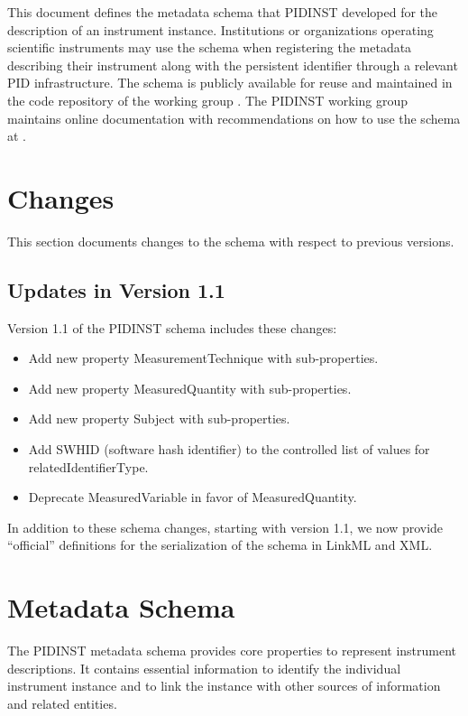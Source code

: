\documentclass[titlepage=true,twoside=false,DIV=13]{scrartcl}
\begin{document}
This document defines the metadata schema that PIDINST developed for
the description of an instrument instance.  Institutions or
organizations operating scientific instruments may use the schema when
registering the metadata describing their instrument along with the
persistent identifier through a relevant PID infrastructure.  The
schema is publicly available for reuse and maintained in the code
repository of the working group \cite{pidinst:github}.  The PIDINST
working group maintains online documentation with recommendations on
how to use the schema at \cite{pidinst:whitepaper}.

\section{Changes}
\label{changes}

This section documents changes to the schema with respect to previous
versions.

\subsection{Updates in Version 1.1}

Version 1.1 of the PIDINST schema includes these changes:
\begin{itemize}
\item Add new property MeasurementTechnique with sub-properties.
\item Add new property MeasuredQuantity with sub-properties.
\item Add new property Subject with sub-properties.
\item Add SWHID (software hash identifier) to the controlled list of
  values for relatedIdentifierType.
\item Deprecate MeasuredVariable in favor of MeasuredQuantity.
\end{itemize}

In addition to these schema changes, starting with version 1.1, we now
provide ``official'' definitions for the serialization of the schema
in LinkML and XML.

\section{Metadata Schema}
\label{schema}

The PIDINST metadata schema provides core properties to represent
instrument descriptions.  It contains essential information to
identify the individual instrument instance and to link the instance
with other sources of information and related entities.
\end{document}
